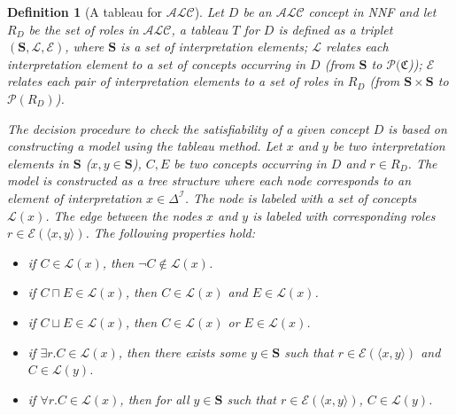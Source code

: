 \documentclass{article}
\newtheorem{mydef}{Definition}
\begin{document}
\begin{mydef}[A tableau for $\mathcal{ALC}$] \label{def:tableauALC}
Let $D$ be an $\mathcal{ALC}$ concept in NNF and let $R_D$ be the set of roles in $\mathcal{ALC}$, a tableau $T$ for $D$ is defined as a triplet $(\mathbf{S},\mathcal{L}, \mathcal{E})$, 
where $\mathbf{S}$ is a set of interpretation elements;
$\mathcal{L}$ relates each interpretation element to a set of concepts occurring in $D$ (from $\mathbf{S}$ to $\mathcal{P}(\mathfrak{C}$)); 
$\mathcal{E}$ relates each pair of interpretation elements to a set of roles in $R_D$  (from $\mathbf{S}\times\mathbf{S}$ to $\mathcal{P}(R_D)$). 

The decision procedure to check the satisfiability of a given concept $D$ is based on constructing a model using the tableau method. 
Let $x$ and $y$ be two interpretation elements in $\mathbf{S}$ ($x,y\in \mathbf{S}$), $C,E$ be two concepts occurring in $D$ and $r\in R_D$.
The model is constructed as a tree structure where each node corresponds to an element of interpretation $x\in \Delta^\mathcal{I}$.
The node is labeled with a set of concepts $\mathcal{L}(x)$.
The edge between the nodes $x$ and $y$ is labeled with corresponding roles $r\in\mathcal{E}(\langle x,y \rangle)$.
The following properties hold:
\begin{itemize}
\item if $C\in \mathcal{L}(x)$, then $\neg C\notin\mathcal{L}(x)$.
\item if $C\sqcap E\in \mathcal{L}(x)$, then $ C\in\mathcal{L}(x)$ and $ E\in\mathcal{L}(x)$.
\item if $C\sqcup E\in \mathcal{L}(x)$, then $ C\in\mathcal{L}(x)$ or $ E\in\mathcal{L}(x)$.
\item if $\exists r.C\in \mathcal{L}(x)$, then there exists some $y\in \mathbf{S}$  such that $r \in \mathcal{E}(\langle x,y\rangle)$ and $C\in\mathcal{L}(y)$.
\item if $\forall r.C\in \mathcal{L}(x)$, then for all $y \in \mathbf{S}$ such that $r \in \mathcal{E}(\langle x,y\rangle)$, $C\in\mathcal{L}(y)$.
\end{itemize}
\end{mydef}
\end{document}
